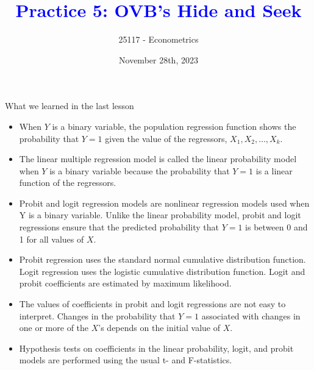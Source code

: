 \documentclass[notes,10pt, aspectratio=169]{beamer}
\title[]{\textcolor{blue}{Practice 5: OVB's Hide and Seek}}
\author{25117 - Econometrics}
\institute[shortinst]{Universitat Pompeu Fabra}
\date{November 28th, 2023}
\begin{document}

\begin{frame}[plain]
\maketitle
\end{frame}

\begin{frame}{What we learned in the last lesson}
\begin{itemize}
\item When $Y$ is a binary variable, the population regression function shows the probability that $Y = 1$ given the value of the regressors, $X_1, X_2,\dots, X_k$.
\item The linear multiple regression model is called the linear probability model when $Y$ is a binary variable because the probability that $Y = 1$ is a linear function of the regressors.
\item Probit and logit regression models are nonlinear regression models used when Y is a binary variable. Unlike the linear probability model, probit and logit regressions ensure that the predicted probability that $Y = 1$ is between 0 and 1 for all values of $X$.
\item Probit regression uses the standard normal cumulative distribution function. Logit regression uses the logistic cumulative distribution function. Logit and probit coefficients are estimated by maximum likelihood.
\item The values of coefficients in probit and logit regressions are not easy to interpret. Changes in the probability that $Y = 1$ associated with changes in one or more of the $X$’s depends on the initial value of $X$.
\item Hypothesis tests on coefficients in the linear probability, logit, and probit models are performed using the usual t- and F-statistics.
\end{itemize}
\end{frame}
\end{document}
